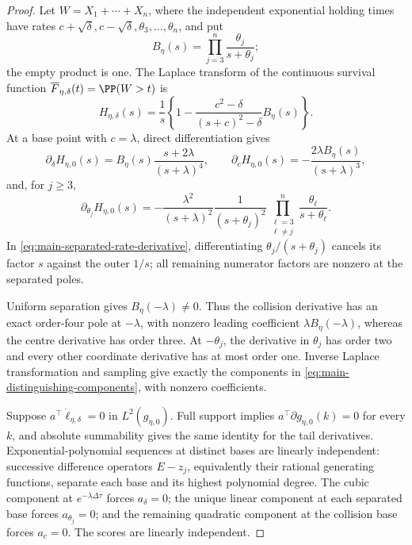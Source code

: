 \begin{proof}
Let \(W=X_1+\cdots+X_n\), where the independent exponential holding times
have rates \(c+\sqrt\delta,c-\sqrt\delta,\theta_3,\ldots,\theta_n\), and put
\[
 B_\eta(s)=\prod_{j=3}^n\frac{\theta_j}{s+\theta_j};
\]
the empty product is one.  The Laplace transform of the continuous survival
function \(\overline F_{\eta,\delta}(t)=\PP(W>t)\) is
\begin{equation}
 H_{\eta,\delta}(s)=\frac1s\left\{1-
 \frac{c^2-\delta}{(s+c)^2-\delta}B_\eta(s)\right\}.
\label{eq:main-survival-transform}
\end{equation}
At a base point with \(c=\lambda\), direct differentiation gives
\begin{equation}
 \partial_\delta H_{\eta,0}(s)
 =B_\eta(s)\frac{s+2\lambda}{(s+\lambda)^4},\qquad
 \partial_cH_{\eta,0}(s)
 =-\frac{2\lambda B_\eta(s)}{(s+\lambda)^3},
\label{eq:main-collision-centre-derivatives}
\end{equation}
and, for \(j\ge3\),
\begin{equation}
 \partial_{\theta_j}H_{\eta,0}(s)
 =-\frac{\lambda^2}{(s+\lambda)^2}
 \frac1{(s+\theta_j)^2}
 \prod_{\substack{\ell=3\\\ell\ne j}}^n
 \frac{\theta_\ell}{s+\theta_\ell}.
\label{eq:main-separated-rate-derivative}
\end{equation}
In \eqref{eq:main-separated-rate-derivative}, differentiating \(\theta_j/(s+\theta_j)\) cancels its
factor \(s\) against the outer \(1/s\); all remaining numerator factors are
nonzero at the separated poles.

Uniform separation gives \(B_\eta(-\lambda)\ne0\).  Thus the collision
derivative has an exact order-four pole at \(-\lambda\), with nonzero leading
coefficient \(\lambda B_\eta(-\lambda)\), whereas the centre derivative has
order three.  At \(-\theta_j\), the derivative in \(\theta_j\) has order two
and every other coordinate derivative has at most order one.  Inverse Laplace
transformation and sampling give exactly the components in \eqref{eq:main-distinguishing-components},
with nonzero coefficients.

Suppose \(a^\top\dot\ell_{\eta,\delta}=0\) in
\(L^2(g_{\eta,0})\).  Full support implies
\(a^\top\partial g_{\eta,0}(k)=0\) for every \(k\), and absolute summability
gives the same identity for the tail derivatives.  Exponential-polynomial
sequences at distinct bases are linearly independent: successive difference
operators \(E-z_j\), equivalently their rational generating functions,
separate each base and its highest polynomial degree.  The cubic component at
\(e^{-\lambda\Delta\tau}\) forces \(a_\delta=0\); the unique linear component
at each separated base forces \(a_{\theta_j}=0\); and the remaining quadratic
component at the collision base forces \(a_c=0\).  The scores are linearly
independent.


\end{proof}
